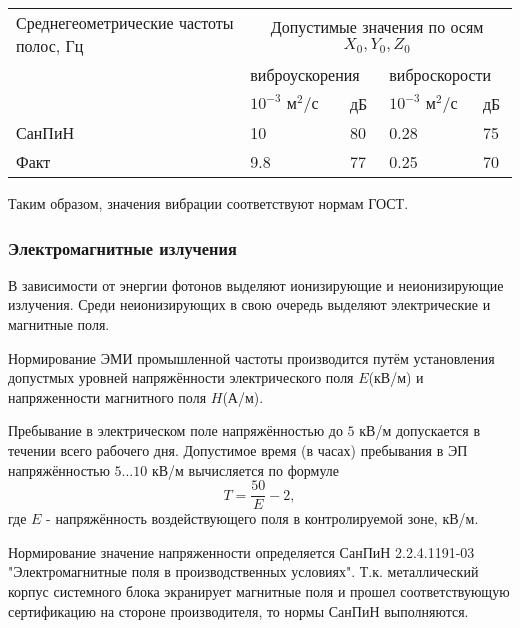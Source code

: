 \begin{table}[H]
\begin{center}
\begin{tabular}{|p{4.1cm}|p{2cm}|p{1cm}|p{2cm}|p{1cm}|}
\hline
Среднегеометрические частоты полос, Гц & \multicolumn{4}{|c|}{Допустимые значения по осям $X_0, Y_0, Z_0$  } \\
\cline{2-5}
       & \multicolumn{2}{|l|}{виброускорения                   }&\multicolumn{2}{|l|}{ виброскорости                    } \\
\cline{2-5}
       & $10^{-3} \mbox{ м}^2 / \mbox{с}$  & дБ & $10^{-3} \mbox{ м}^2 / \mbox{с}$  & дБ   \\
\hline
СанПиН & 10                                & 80 & 0.28                              & 75   \\
\hline
Факт   & 9.8                               & 77 & 0.25                              & 70   \\
\hline
\end{tabular}
\end{center}
\end{table}

Таким образом, значения вибрации соответствуют нормам ГОСТ.

\subsubsection{Электромагнитные излучения}

В зависимости от энергии фотонов выделяют ионизирующие и неиони\-зирующие излу\-чения. Среди неионизирующих в свою очередь выделяют элек\-трические и магнитные поля.

Нормирование ЭМИ промышленной частоты производится путём уста\-новления допус\-тмых уровней напряжённости электрического поля $E$(кВ/м) и напряженности маг\-нитного поля $H$(А/м).

Пребывание в электрическом поле напряжённостью до $5$ кВ/м допускается в течении всего рабочего дня. Допустимое время (в часах) пребывания в ЭП напряжённостью $5 \ldots 10$ кВ/м вычисляется по формуле
$$
T = \frac{50}{E} - 2,
$$
где $E$ - напряжённость воздействующего поля в контролируемой зоне, кВ/м.

Нормирование значение напряженности определяется СанПиН 2.2.4.1191-03 "Электро\-магнитные поля в производственных условиях". Т.к. металличес\-кий корпус системного блока экранирует магнитные поля и прошел соответ\-ствующую сертификацию на стороне производителя, то нормы СанПиН вы\-полняются.

